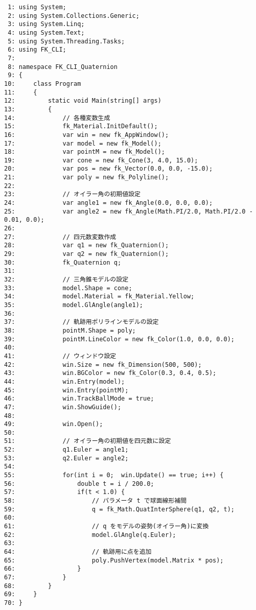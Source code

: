 \begin{breakbox}
\begin{small}
\begin{verbatim}
 1: using System;
 2: using System.Collections.Generic;
 3: using System.Linq;
 4: using System.Text;
 5: using System.Threading.Tasks;
 6: using FK_CLI;
 7: 
 8: namespace FK_CLI_Quaternion
 9: {
10:     class Program
11:     {
12:         static void Main(string[] args)
13:         {
14:             // 各種変数生成
15:             fk_Material.InitDefault();
16:             var win = new fk_AppWindow();
17:             var model = new fk_Model();
18:             var pointM = new fk_Model();
19:             var cone = new fk_Cone(3, 4.0, 15.0);
20:             var pos = new fk_Vector(0.0, 0.0, -15.0);
21:             var poly = new fk_Polyline();
22: 
23:             // オイラー角の初期値設定
24:             var angle1 = new fk_Angle(0.0, 0.0, 0.0);
25:             var angle2 = new fk_Angle(Math.PI/2.0, Math.PI/2.0 - 0.01, 0.0);
26: 
27:             // 四元数変数作成
28:             var q1 = new fk_Quaternion();
29:             var q2 = new fk_Quaternion();
30:             fk_Quaternion q;
31: 
32:             // 三角錐モデルの設定
33:             model.Shape = cone;
34:             model.Material = fk_Material.Yellow;
35:             model.GlAngle(angle1);
36: 
37:             // 軌跡用ポリラインモデルの設定
38:             pointM.Shape = poly;
39:             pointM.LineColor = new fk_Color(1.0, 0.0, 0.0);
40: 
41:             // ウィンドウ設定
42:             win.Size = new fk_Dimension(500, 500);
43:             win.BGColor = new fk_Color(0.3, 0.4, 0.5);
44:             win.Entry(model);
45:             win.Entry(pointM);
46:             win.TrackBallMode = true;
47:             win.ShowGuide();
48: 
49:             win.Open();
50: 
51:             // オイラー角の初期値を四元数に設定
52:             q1.Euler = angle1;
53:             q2.Euler = angle2;
54: 
55:             for(int i = 0;  win.Update() == true; i++) {
56:                 double t = i / 200.0;
57:                 if(t < 1.0) {
58:                     // パラメータ t で球面線形補間
59:                     q = fk_Math.QuatInterSphere(q1, q2, t);
60: 
61:                     // q をモデルの姿勢(オイラー角)に変換
62:                     model.GlAngle(q.Euler);
63: 
64:                     // 軌跡用に点を追加
65:                     poly.PushVertex(model.Matrix * pos);
66:                 }
67:             }
68:         }
69:     }
70: }
\end{verbatim}
\end{small}
\end{breakbox}

